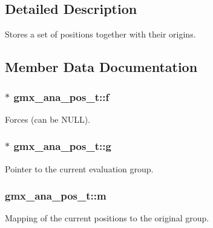 \subsection{\-Detailed \-Description}
\-Stores a set of positions together with their origins. 

\subsection{\-Member \-Data \-Documentation}
\hypertarget{structgmx__ana__pos__t_a3e337b4e370615fef4e55395496ffada}{
\subsubsection[{f}]{ $\ast$ {\bf gmx\-\_\-ana\-\_\-pos\-\_\-t\-::f}}}\label{structgmx__ana__pos__t_a3e337b4e370615fef4e55395496ffada}


\-Forces (can be \-N\-U\-L\-L). 

\hypertarget{structgmx__ana__pos__t_ab12af55e452332476dd74fa28e52e2b6}{
\subsubsection[{g}]{ $\ast$ {\bf gmx\-\_\-ana\-\_\-pos\-\_\-t\-::g}}}\label{structgmx__ana__pos__t_ab12af55e452332476dd74fa28e52e2b6}


\-Pointer to the current evaluation group. 

\hypertarget{structgmx__ana__pos__t_a7e0c3f28330c1336b49b9992a9885e20}{
\subsubsection[{m}]{ {\bf gmx\-\_\-ana\-\_\-pos\-\_\-t\-::m}}}\label{structgmx__ana__pos__t_a7e0c3f28330c1336b49b9992a9885e20}


\-Mapping of the current positions to the original group. 

